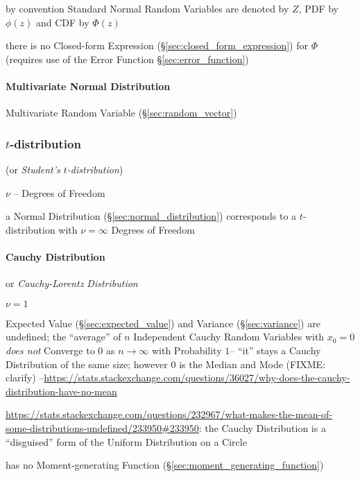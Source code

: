by convention Standard Normal Random Variables are denoted by $Z$, PDF by
$\phi(z)$ and CDF by $\Phi(z)$

there is no Closed-form Expression (\S\ref{sec:closed_form_expression}) for
$\Phi$ (requires use of the Error Function \S\ref{sec:error_function})



\paragraph{Multivariate Normal Distribution}\label{sec:multivariate_normal}
\hfill

Multivariate Random Variable (\S\ref{sec:random_vector})



\subsubsection{$t$-distribution}\label{sec:t_distribution}

(or \emph{Student's $t$-distribution})

$\nu$ -- Degrees of Freedom

a Normal Distribution (\S\ref{sec:normal_distribution}) corresponds to a
$t$-distribution with $\nu = \infty$ Degrees of Freedom



\paragraph{Cauchy Distribution}\label{sec:cauchy_distribution}\hfill

or \emph{Cauchy-Lorentz Distribution}

$\nu = 1$

Expected Value (\S\ref{sec:expected_value}) and Variance (\S\ref{sec:variance})
are undefined; the ``average'' of $n$ Independent Cauchy Random Variables with
$x_0 = 0$ \emph{does not} Converge to $0$ as $n \rightarrow \infty$ with
Probability $1$-- ``it'' stays a Cauchy Distribution of the same size; however
$0$ is the Median and Mode (FIXME: clarify)
--\url{https://stats.stackexchange.com/questions/36027/why-does-the-cauchy-distribution-have-no-mean}

\url{https://stats.stackexchange.com/questions/232967/what-makes-the-mean-of-some-distributions-undefined/233950#233950}:
the Cauchy Distribution is a ``disguised'' form of the Uniform Distribution on a
Circle

has no Moment-generating Function (\S\ref{sec:moment_generating_function})

